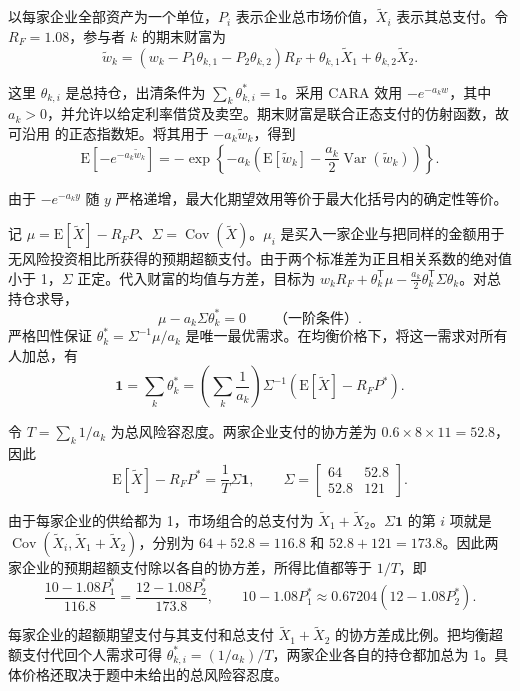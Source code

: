 \begin{solution}[blank-type=manual,blank-vsep=8\baselineskip]
以每家企业全部资产为一个单位，$P_i$ 表示企业总市场价值，$\widetilde X_i$ 表示其总支付。令 $R_F=1.08$，参与者 $k$ 的期末财富为
\[
 \widetilde w_k=(w_k-P_1\theta_{k,1}-P_2\theta_{k,2})R_F
 +\theta_{k,1}\widetilde X_1+\theta_{k,2}\widetilde X_2.
\]

这里 $\theta_{k,i}$ 是总持仓，出清条件为 $\sum_k\theta_{k,i}^*=1$。采用 CARA 效用 $-e^{-a_k w}$，其中 $a_k>0$，并允许以给定利率借贷及卖空。期末财富是联合正态支付的仿射函数，故可沿用 的正态指数矩。将其用于 $-a_k\widetilde w_k$，得到
\[
 \mathrm E[-e^{-a_k\widetilde w_k}]
 =-\exp\left\{-a_k
 \left(\mathrm E[\widetilde w_k]
 -\frac{a_k}{2}\operatorname{Var}(\widetilde w_k)\right)\right\}.
\]

由于 $-e^{-a_k y}$ 随 $y$ 严格递增，最大化期望效用等价于最大化括号内的确定性等价。

记 $\mu=\mathrm E[\widetilde X]-R_FP$、$\Sigma=\operatorname{Cov}(\widetilde X)$。$\mu_i$ 是买入一家企业与把同样的金额用于无风险投资相比所获得的预期超额支付。由于两个标准差为正且相关系数的绝对值小于 1，$\Sigma$ 正定。代入财富的均值与方差，目标为 $w_kR_F+\theta_k^{\mathsf T}\mu-\tfrac{a_k}{2}\theta_k^{\mathsf T}\Sigma\theta_k$。对总持仓求导，
 \[
 \mu-a_k\Sigma\theta_k^*=0\qquad\text{（一阶条件）}.
 \]
 严格凹性保证 $\theta_k^*=\Sigma^{-1}\mu/a_k$ 是唯一最优需求。在均衡价格下，将这一需求对所有人加总，有
\[
 \mathbf1=\sum_k\theta_k^*
 =\left(\sum_k\frac1{a_k}\right)\Sigma^{-1}(\mathrm E[\widetilde X]-R_FP^*).
\]

令 $T=\sum_k1/a_k$ 为总风险容忍度。两家企业支付的协方差为 $0.6\times8\times11=52.8$，因此
\[
 \mathrm E[\widetilde X]-R_FP^*=\frac1T\Sigma\mathbf1,
 \qquad
 \Sigma=\begin{bmatrix}64&52.8\\52.8&121\end{bmatrix}.
\]

由于每家企业的供给都为 1，市场组合的总支付为 $\widetilde X_1+\widetilde X_2$。$\Sigma\mathbf 1$ 的第 $i$ 项就是 $\operatorname{Cov}(\widetilde X_i,\widetilde X_1+\widetilde X_2)$，分别为 $64+52.8=116.8$ 和 $52.8+121=173.8$。因此两家企业的预期超额支付除以各自的协方差，所得比值都等于 $1/T$，即
\[
 \boxed{\frac{10-1.08P_1^*}{116.8}
 =\frac{12-1.08P_2^*}{173.8}},
 \qquad
 10-1.08P_1^*\approx0.67204(12-1.08P_2^*).
\]

每家企业的超额期望支付与其支付和总支付 $\widetilde X_1+\widetilde X_2$ 的协方差成比例。把均衡超额支付代回个人需求可得 $\theta_{k,i}^*=(1/a_k)/T$，两家企业各自的持仓都加总为 1。具体价格还取决于题中未给出的总风险容忍度。
\end{solution}

